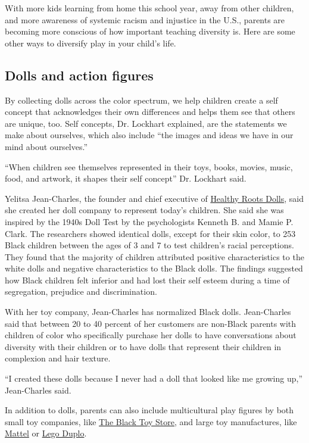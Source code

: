 With more kids learning from home this school year, away from other
children, and more awareness of systemic racism and injustice in the
U.S., parents are becoming more conscious of how important teaching
diversity is. Here are some other ways to diversify play in your child's
life.

\hypertarget{dolls-and-action-figures}{%
\subsection{Dolls and action figures}\label{dolls-and-action-figures}}

By collecting dolls across the color spectrum, we help children create a
self concept that acknowledges their own differences and helps them see
that others are unique, too. Self concepts, Dr. Lockhart explained, are
the statements we make about ourselves, which also include ``the images
and ideas we have in our mind about ourselves.''

``When children see themselves represented in their toys, books, movies,
music, food, and artwork, it shapes their self concept'' Dr. Lockhart
said.

Yelitsa Jean-Charles, the founder and chief executive of
\href{https://healthyrootsdolls.com/}{Healthy Roots Dolls}, said she
created her doll company to represent today's children. She said she was
inspired by the 1940s Doll Test by the psychologists Kenneth B. and
Mamie P. Clark. The researchers showed identical dolls, except for their
skin color, to 253 Black children between the ages of 3 and 7 to test
children's racial perceptions. They found that the majority of children
attributed positive characteristics to the white dolls and negative
characteristics to the Black dolls. The findings suggested how Black
children felt inferior and had lost their self esteem during a time of
segregation, prejudice and discrimination.

With her toy company, Jean-Charles has normalized Black dolls.
Jean-Charles said that between 20 to 40 percent of her customers are
non-Black parents with children of color who specifically purchase her
dolls to have conversations about diversity with their children or to
have dolls that represent their children in complexion and hair texture.

``I created these dolls because I never had a doll that looked like me
growing up,'' Jean-Charles said.

In addition to dolls, parents can also include multicultural play
figures by both small toy companies, like
\href{https://blacktoystore.com/product-category/action-figures/}{The
Black Toy Store}, and large toy manufactures, like
\href{https://corporate.mattel.com/news/mattel-unveils-special-edition-thankyouheroes-collection-from-fisher-price-xae-to-honor-today-s-heroes}{Mattel}
or
\href{https://education.lego.com/en-us/products/people-by-lego-education/45030\#product}{Lego
Duplo}.

